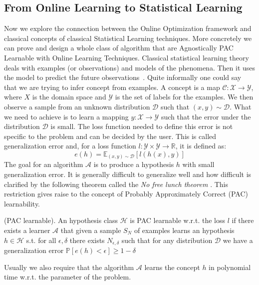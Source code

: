 \subsection{From Online Learning to Statistical Learning}\label{sec:stat_learning}
Now we explore the connection between the Online Optimization framework and classical concepts of classical Statistical Learning techniques. More concretely we can prove and design a whole class of algorithm that are Agnostically PAC Learnable with Online Learning Techniques.
Classical statistical learning theory deals with examples (or observations) and models of the phenomena. Then it uses the model to predict the future observations~\cite{bousquet2003introduction}. Quite informally one could say that we are trying to infer concept from examples. A concept is a map $\mathcal C:\mathcal X\to\mathcal Y$, where $X$ is the domain space and $\mathcal Y$ is the set of labels for the examples. We then observe a sample from an unknown distribution $\mathcal D$ such that $(x,y)\sim \mathcal D$. What we need to achieve is to learn a mapping $y:\mathcal X\to\mathcal Y$ such that the error under the distribution $\mathcal D$ is small. The loss function needed to define this error is not specific to the problem and can be decided by the user. This is called generalization error and, for a loss function $l:\mathcal Y\times\mathcal Y \to\mathbb R$, it is defined as:
\begin{equation}\label{eq:generalization}
    e(h) = \mathbb E_{(x,y)\sim \mathcal D}[l(h(x),y)]
\end{equation}
The goal for an algorithm $\mathcal A$ is to produce a hypothesis $h$ with small generalization error. 
It is generally difficult to generalize well and how difficult is clarified by the following theorem called the \emph{No free lunch theorem} \cite{mitchell1997machine}.
This restriction gives raise to the concept of Probably Approximately Correct (PAC) learnability. 

\begin{definition}(PAC learnable).\label{def:PAC}
    An hypothesis class $\mathcal H$ is PAC learnable w.r.t. the loss $l$ if there exists a learner $\mathcal A$ that given a sample $S_N$ of examples learns an hypothesis $h\in\mathcal H$ s.t. for all $\epsilon,\delta$ there exists $N_{\epsilon,\delta}$ such that for any distribution $\mathcal D$ we have a generalization error $\mathbb P[e(h)<\epsilon]\ge1-\delta$
\end{definition}

Usually we also require that the algorithm $\mathcal A$ learns the concept $h$ in polynomial time w.r.t. the parameter of the problem. 

